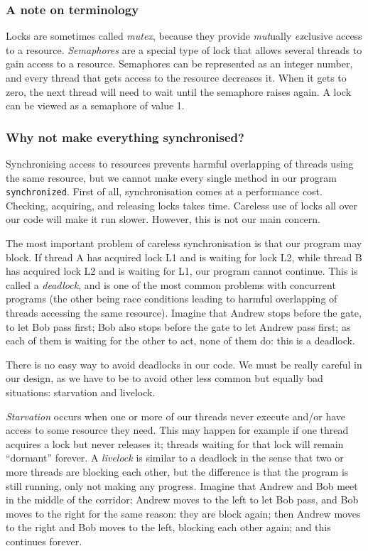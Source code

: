 \subsubsection*{A note on terminology}
\label{sec:note-terminology}

Locks are sometimes called \emph{mutex}, because they provide \emph{mut}ually
\emph{ex}clusive access to a resource. \emph{Semaphores} are a special type
of lock that allows several threads to gain access to a
resource. Semaphores can be represented as an integer number, and
every thread that gets access to the resource decreases it. When it
gets to zero, the next thread will need to wait until the semaphore
raises again. A lock can be viewed as a semaphore of value 1. 

\subsubsection{Why not make everything synchronised?}
\label{sec:why-not-make}

Synchronising access to resources prevents harmful overlapping of
threads using the same resource, but we cannot make every single
method in our program \verb+synchronized+. First of all,
synchronisation comes at a performance cost. Checking, acquiring, and
releasing locks takes time. Careless use of locks all over our code
will make it run slower. However, this is not our main concern. 

The most important problem of careless synchronisation is that our
program may block. If thread A has acquired lock L1 and is waiting for
lock L2, while thread B has acquired lock L2 and is
waiting for L1, our program cannot continue. This is
called a \emph{deadlock}, and is one of the most common problems with
concurrent programs (the other being race conditions leading
to harmful overlapping of threads accessing the same resource). 
%
Imagine that Andrew stops before the gate, to let Bob pass first; Bob
also stops before the gate to let Andrew pass first; as each of them
is waiting for the other to act, none of them do: this is a deadlock. 

There is no easy way to avoid deadlocks in our code. We must be really
careful in our design, as we have to be to avoid other less common but
equally bad situations: starvation and livelock. 

\emph{Starvation} occurs when one or more of our threads never execute
and/or have access to some resource they need. This may happen for
example if one thread acquires a lock but never releases it; threads
waiting for that lock will remain ``dormant'' forever.
%
A \emph{livelock} is similar to a deadlock in the sense that two or
more threads are blocking each other, but the difference is that the
program is still running, only not making any progress. Imagine that
Andrew and Bob meet in the middle of the corridor; Andrew moves to the
left to let Bob pass, and Bob moves to the right for the same reason:
they are block again; then Andrew moves to the right and Bob moves to
the left, blocking each other again; and this continues forever. 

